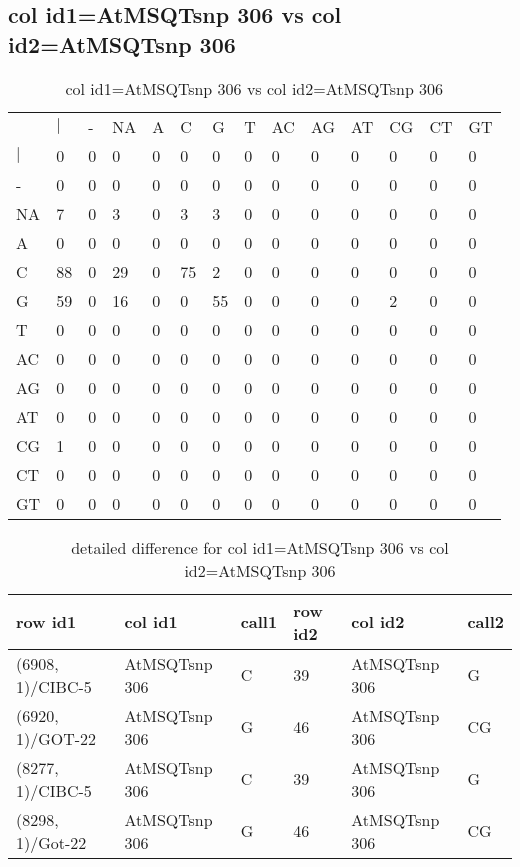 \subsection{col id1=AtMSQTsnp 306 vs col id2=AtMSQTsnp 306}
\begin{center}
\begin{longtable}{|l|l|l|l|l|l|l|l|l|l|l|l|l|l|}
\caption{col id1=AtMSQTsnp 306 vs col id2=AtMSQTsnp 306} \label{table_dm844}\\
\hline
\\
\hline
&$|$&-&NA&A&C&G&T&AC&AG&AT&CG&CT&GT\\
$|$&0&0&0&0&0&0&0&0&0&0&0&0&0\\
-&0&0&0&0&0&0&0&0&0&0&0&0&0\\
NA&7&0&3&0&3&3&0&0&0&0&0&0&0\\
A&0&0&0&0&0&0&0&0&0&0&0&0&0\\
C&88&0&29&0&75&2&0&0&0&0&0&0&0\\
G&59&0&16&0&0&55&0&0&0&0&2&0&0\\
T&0&0&0&0&0&0&0&0&0&0&0&0&0\\
AC&0&0&0&0&0&0&0&0&0&0&0&0&0\\
AG&0&0&0&0&0&0&0&0&0&0&0&0&0\\
AT&0&0&0&0&0&0&0&0&0&0&0&0&0\\
CG&1&0&0&0&0&0&0&0&0&0&0&0&0\\
CT&0&0&0&0&0&0&0&0&0&0&0&0&0\\
GT&0&0&0&0&0&0&0&0&0&0&0&0&0\\
\hline
\end{longtable}
\end{center}

\begin{center}
\begin{longtable}{|l|l|l|l|l|l|}
\caption{detailed difference for col id1=AtMSQTsnp 306 vs col id2=AtMSQTsnp 306} \label{table_dm845}\\
\hline
row id1&col id1&call1&row id2&col id2&call2\\
\hline
(6908, 1)/CIBC-5&AtMSQTsnp 306&C&39&AtMSQTsnp 306&G\\
(6920, 1)/GOT-22&AtMSQTsnp 306&G&46&AtMSQTsnp 306&CG\\
(8277, 1)/CIBC-5&AtMSQTsnp 306&C&39&AtMSQTsnp 306&G\\
(8298, 1)/Got-22&AtMSQTsnp 306&G&46&AtMSQTsnp 306&CG\\
\hline
\end{longtable}
\end{center}

